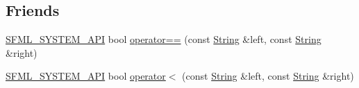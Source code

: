 \subsection*{Friends}
\begin{DoxyCompactItemize}
\item 
\hyperlink{_system_2_export_8hpp_a6476c9e422606477a4c23d92b1d79a1f}{S\-F\-M\-L\-\_\-\-S\-Y\-S\-T\-E\-M\-\_\-\-A\-P\-I} bool \hyperlink{classsf_1_1_string_a2a385459fa9a237e61a712fa956d489e}{operator==} (const \hyperlink{classsf_1_1_string}{String} \&left, const \hyperlink{classsf_1_1_string}{String} \&right)
\item 
\hyperlink{_system_2_export_8hpp_a6476c9e422606477a4c23d92b1d79a1f}{S\-F\-M\-L\-\_\-\-S\-Y\-S\-T\-E\-M\-\_\-\-A\-P\-I} bool \hyperlink{classsf_1_1_string_ac2ca5a7703402a2bbafd85eec6d1e846}{operator$<$} (const \hyperlink{classsf_1_1_string}{String} \&left, const \hyperlink{classsf_1_1_string}{String} \&right)
\end{DoxyCompactItemize}
